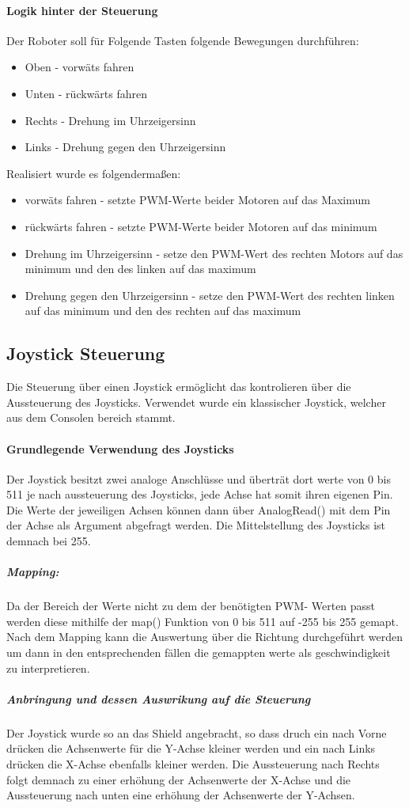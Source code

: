 \documentclass[12pt]{article}
\begin{document}
\paragraph{Logik hinter der Steuerung}
Der Roboter soll für Folgende Tasten folgende Bewegungen durchführen:
\begin{itemize}
\item Oben - vorwäts fahren
\item Unten - rückwärts fahren
\item Rechts - Drehung im Uhrzeigersinn
\item Links - Drehung gegen den Uhrzeigersinn
\end{itemize}

Realisiert wurde es folgendermaßen:
\begin{itemize}
\item vorwäts fahren - setzte PWM-Werte beider Motoren auf das Maximum
\item rückwärts fahren - setzte PWM-Werte beider Motoren auf das minimum
\item Drehung im Uhrzeigersinn - setze den PWM-Wert des rechten Motors auf das minimum und den des linken auf das maximum
\item Drehung gegen den Uhrzeigersinn - setze den PWM-Wert des rechten linken auf das minimum und den des rechten auf das maximum
\end{itemize}

\subsection{Joystick Steuerung} %
Die Steuerung über einen Joystick ermöglicht das kontrolieren über die Aussteuerung des Joysticks. Verwendet wurde ein klassischer Joystick, welcher aus dem Consolen bereich stammt.
\paragraph{Grundlegende Verwendung des Joysticks}
Der Joystick besitzt zwei analoge Anschlüsse und überträt dort werte von 0 bis 511 je nach aussteuerung des Joysticks, jede Achse hat somit ihren eigenen Pin.
Die Werte der jeweiligen Achsen können dann über AnalogRead() mit dem Pin der Achse als Argument abgefragt werden.
Die Mittelstellung des Joysticks ist demnach bei 255.
\subparagraph{Mapping:}
Da der Bereich der Werte nicht zu dem der benötigten PWM- Werten passt werden diese mithilfe der map() Funktion von 0 bis 511 auf -255 bis 255 gemapt. 
Nach dem Mapping kann die Auswertung über die Richtung durchgeführt werden um dann in den entsprechenden fällen die gemappten werte als geschwindigkeit zu interpretieren.
\subparagraph{Anbringung und dessen Auswrikung auf die Steuerung}
Der Joystick wurde so an das Shield angebracht, so dass druch ein nach Vorne drücken die Achsenwerte für die Y-Achse kleiner werden und ein nach Links drücken die X-Achse ebenfalls kleiner werden. Die Aussteuerung nach Rechts folgt demnach zu einer erhöhung der Achsenwerte der X-Achse und die Aussteuerung nach unten eine erhöhung der Achsenwerte der Y-Achsen.   
\end{document}
